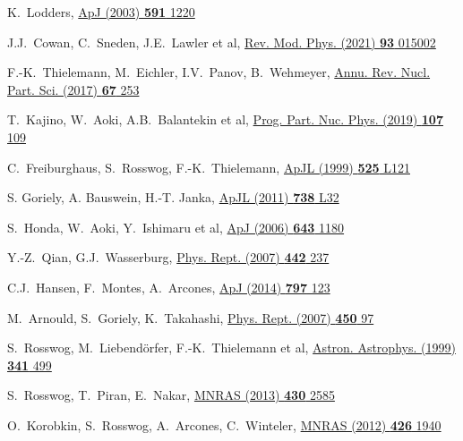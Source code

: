 \renewcommand{\refname}{Список литературы}
\begin{thebibliography}{9}

K.~Lodders,
\href{https://doi.org/10.1086/375492}
  {ApJ (2003) \textbf{591} 1220}

J.J.~Cowan, C.~Sneden, J.E.~Lawler et al,
\href{https://doi.org/10.1103/RevModPhys.93.015002}
  {Rev. Mod. Phys. (2021) \textbf{93} 015002}

F.-K.~Thielemann, M.~Eichler, I.V.~Panov, B.~Wehmeyer,
\href{https://doi.org/10.1146/annurev-nucl-101916-123246}
  {Annu. Rev. Nucl. Part. Sci. (2017) \textbf{67} 253}

T.~Kajino, W.~Aoki, A.B.~Balantekin et al,
\href{https://doi.org/10.1016/j.ppnp.2019.02.008}
  {Prog. Part. Nuc. Phys. (2019) \textbf{107} 109}

C.~Freiburghaus, S.~Rosswog, F.-K.~Thielemann,
\href{https://doi.org/10.1086/312343}
  {ApJL (1999) \textbf{525} L121}

S. Goriely, A. Bauswein, H.-T. Janka, 
\href{https://doi.org/10.1088/2041-8205/738/2/L32}
  {ApJL (2011) \textbf{738} L32}

S.~Honda, W.~Aoki, Y.~Ishimaru et al,
\href{https://doi.org/10.1086/503195}
  {ApJ (2006) \textbf{643} 1180}

Y.-Z.~Qian, G.J.~Wasserburg,
\href{https://doi.org/10.1016/j.physrep.2007.02.006}
  {Phys. Rept. (2007) \textbf{442} 237}

C.J.~Hansen, F.~Montes, A.~Arcones,
\href{https://doi.org/10.1088/0004-637X/797/2/123}
  {ApJ (2014) \textbf{797} 123}

M.~Arnould, S.~Goriely, K.~Takahashi,
\href{https://doi.org/10.1016/j.physrep.2007.06.002}
  {Phys. Rept. (2007) \textbf{450} 97}

S.~Rosswog, M.~Liebendörfer, F.-K.~Thielemann et al,
\href{https://doi.org/10.48550/arXiv.astro-ph/9811367}
  {Astron. Astrophys. (1999) \textbf{341} 499}

S.~Rosswog, T.~Piran, E.~Nakar,
\href{ttps://doi.org/10.1093/mnras/sts708}
  {MNRAS (2013) \textbf{430} 2585}

O.~Korobkin, S.~Rosswog, A.~Arcones, C.~Winteler,
\href{https://doi.org/10.1111/j.1365-2966.2012.21859.x}
  {MNRAS (2012) \textbf{426} 1940}


\end{thebibliography}
